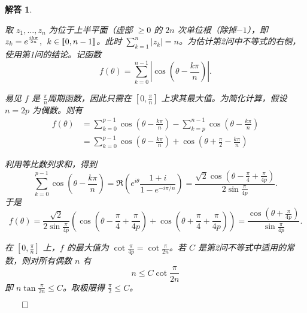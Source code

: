 \documentclass[12pt,UTF8]{ctexbook}
\theoremstyle{exercisestyle}
\theoremstyle{solutionstyle}
\newtheorem*{solution*}{解答}
\newenvironment{solution}
  {\begin{solution*}}
  {\hfill\ensuremath{\qed}\end{solution*}}
\begin{document}
\begin{solution}
\begin{subquestions}
\item 取 \( z_1, \ldots, z_n \) 为位于上半平面（虚部 \(\geqslant 0\) 的 \(2n\) 次单位根（除掉$-1$），即 \( z_k = e^{\frac{ik\pi}{2n}},\;\, k \in [\![0,n-1]\!] \)。此时 \( \sum_{k=1}^{n} |z_k| = n \)。为估计第2问中不等式的右侧，使用第1问的结论。记函数
\[
f(\theta) = \sum_{k=0}^{n-1} \left| \cos \left( \theta - \frac{k\pi}{n} \right) \right|.
\]

易见 \( f \) 是 \( \displaystyle\frac{\pi}{n} \)\dash 周期函数，因此只需在 \(\displaystyle\left[0, \frac{\pi}{n}\right]\) 上求其最大值。为简化计算，假设 \( n = 2p \) 为偶数。则有
\begin{align*}
f(\theta) &= \sum_{k=0}^{p-1} \cos\left(\theta - \frac{k\pi}{n}\right) - \sum_{k=p}^{n-1} \cos\left(\theta - \frac{k\pi}{n}\right) \\
&= \sum_{k=0}^{p-1} \cos\left(\theta - \frac{k\pi}{n}\right) + \cos\left(\theta + \frac{\pi}{2} - \frac{k\pi}{n}\right)
\end{align*}

利用等比数列求和，得到
\[
\sum_{k=0}^{p-1} \cos\left(\theta - \frac{k\pi}{n}\right) = \Re\left(e^{i\theta} \frac{1+i}{1 - e^{-i\pi/n}}\right) = \frac{\sqrt{2}\cos\left(\theta - \frac{\pi}{4} + \frac{\pi}{4p}\right)}{2\sin\frac{\pi}{4p}}.
\]
于是
\[
f(\theta) = \frac{\sqrt{2}}{2\sin\frac{\pi}{4p}} \left( \cos\left(\theta - \frac{\pi}{4} + \frac{\pi}{4p}\right) + \cos\left(\theta + \frac{\pi}{4} + \frac{\pi}{4p}\right) \right) = \frac{\cos(\theta + \frac{\pi}{4p})}{\sin\frac{\pi}{4p}}.
\]

在 \(\left[0, \frac{\pi}{n}\right]\) 上，\( f \) 的最大值为 \(\cot \frac{\pi}{4p} = \cot \frac{\pi}{2n}\)。若 \( C \) 是第2问不等式中适用的常数，则对所有偶数 \( n \) 有
\[
n \leqslant C \cot \frac{\pi}{2n}
\]
即 \( n \tan \frac{\pi}{2n} \leqslant C \)。取极限得 \( \frac{\pi}{2} \leqslant C \)。
\end{subquestions}

\end{solution}
\end{document}
